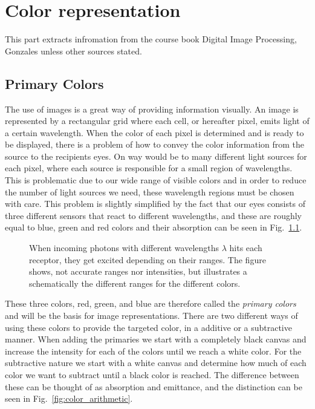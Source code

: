\chapter{Color representation}
\label{chap:color_rep}

This part extracts infromation from the course book Digital Image Processing, Gonzales \cite{diProcessing} unless other sources stated.

\section{Primary Colors}

The use of images is a great way of providing information visually. An image is represented by a rectangular grid where each cell, or hereafter pixel, emits light of a certain wavelength. When the color of each pixel is determined and is ready to be displayed, there is a problem of how to convey the color information from the source to the recipients eyes. On way would be to many different light sources for each pixel, where each source is responsible for a small region of wavelengths. This is problematic due to our wide range of visible colors and in order to reduce the number of light sources we need, these wavelength regions must be chosen with care. This problem is slightly simplified by the fact that our eyes consists of three different sensors that react to different wavelengths, and these are roughly equal to blue, green and red colors and their absorption can be seen in Fig.~\ref{fig:colorAbsorption}.

\begin{figure}[h]
    \centering
    \resizebox{0.49\textwidth}{!}{
        
    }
    \caption{\label{fig:colorAbsorption}When incoming photons with different wavelengths $\lambda$ hits each receptor, they get excited depending on their ranges. The figure shows, not accurate ranges nor intensities, but illustrates a schematically the different ranges for the different colors. }
\end{figure}

These three colors, red, green, and blue are therefore called the \textit{primary colors} and will be the basis for image representations. There are two different ways of using these colors to provide the targeted color, in a additive or a subtractive manner. When adding the primaries we start with a completely black canvas and increase the intensity for each of the colors until we reach a white color. For the subtractive nature we start with a white canvas and determine how much of each color we want to subtract until a black color is reached. The difference between these can be thought of as absorption and emittance, and the distinction can be seen in Fig.~\ref{fig:color_arithmetic}.

